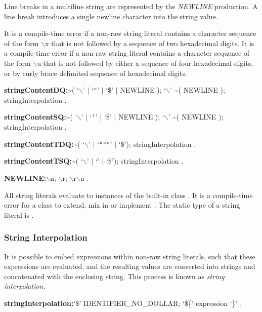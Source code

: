 \documentclass{article}
\begin{document}
\LMHash{}
Line breaks in a multiline string are represented by the {\em NEWLINE} production.
A line break introduces a single newline character into the string value.

\LMHash{}
It is a compile-time error if a non-raw string literal contains a character sequence of the form $\backslash$x that is not followed by a sequence of two hexadecimal digits.
It is a compile-time error if a non-raw string literal contains a character sequence of the form $\backslash$u that is not followed by either a sequence of four hexadecimal digits, or by curly brace delimited sequence of hexadecimal digits.

\begin{grammar}
{\bf stringContentDQ:}\~{}( `$\backslash$' $|$ `{\escapegrammar \texttt{"}}' $|$ `\$' $|$ NEWLINE );
  `$\backslash$' \~{}( NEWLINE );
  stringInterpolation
  .

{\bf stringContentSQ:}\~{}( `$\backslash$' $|$ `{\escapegrammar \texttt{'}}' $|$ `\$' $|$ NEWLINE );
  `$\backslash$' \~{}( NEWLINE );
  stringInterpolation
  .

{\bf stringContentTDQ:}\~{}( `$\backslash$' $|$ `{\escapegrammar \texttt{"""}}' $|$ `\$');
  stringInterpolation
  .

{\bf stringContentTSQ:}\~{}( `$\backslash$' $|$ `{\escapegrammar {}}' $|$ `\$');
  stringInterpolation
  .

{\bf NEWLINE:}$\backslash$n;
  $\backslash$r;
  $\backslash$r$\backslash$n
  .
\end{grammar}

\LMHash{}
All string literals evaluate to instances of the built-in class .
It is a compile-time error for a class to extend, mix in or implement .
The static type of a string literal is .


\subsubsection{String Interpolation}

\LMHash{}
It is possible to embed expressions within non-raw string literals, such that these expressions are evaluated, and the resulting values are converted into strings and concatenated with the enclosing string.
This process is known as {\em string interpolation}.

\begin{grammar}
{\bf stringInterpolation:}`\$' IDENTIFIER\_NO\_DOLLAR;
  `\$\{' expression `\}'
  .
\end{grammar}
\end{document}
